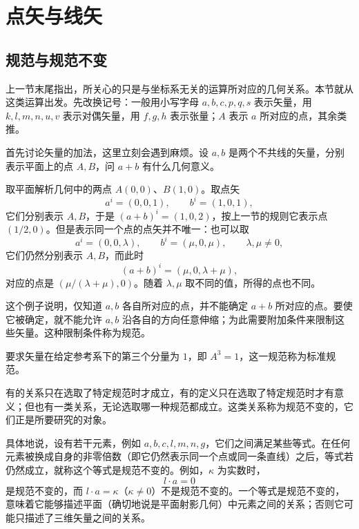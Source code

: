 \chapter{点矢与线矢}

\section{规范与规范不变}

上一节末尾指出，所关心的只是与坐标系无关的运算所对应的几何关系。本节就从这类运算出发。先改换记号：一般用小写字母 $a,b,c,p,q,s$ 表示矢量，用 $k,l,m,n,u,v$ 表示对偶矢量，用 $f,g,h$ 表示张量；$A$ 表示 $a$ 所对应的点，其余类推。

首先讨论矢量的加法，这里立刻会遇到麻烦。设 $a,b$ 是两个不共线的矢量，分别表示平面上的点 $A,B$，问 $a+b$ 有什么几何意义。

\begin{example}
取平面解析几何中的两点 $A(0,0)$、$B(1,0)$。取点矢
\[
a^i=(0,0,1),\qquad b^i=(1,0,1),
\]
它们分别表示 $A,B$，于是 $(a+b)^i=(1,0,2)$，按上一节的规则它表示点 $(1/2,0)$。但是表示同一个点的点矢并不唯一：也可以取
\[
a^i=(0,0,\lambda),\qquad b^i=(\mu,0,\mu),\qquad \lambda,\mu\neq 0,
\]
它们仍然分别表示 $A,B$，而此时
\[
(a+b)^i=(\mu,0,\lambda+\mu),
\]
对应的点是 $(\mu/(\lambda+\mu),0)$。随着 $\lambda,\mu$ 取不同的值，所得的点也不同。
\end{example}

这个例子说明，仅知道 $a,b$ 各自所对应的点，并不能确定 $a+b$ 所对应的点。要使它被确定，就不能允许 $a,b$ 沿各自的方向任意伸缩；为此需要附加条件来限制这些矢量。这种限制条件称为规范。

\begin{definition}[标准规范]
要求矢量在给定参考系下的第三个分量为 $1$，即 $A^3=1$，这一规范称为标准规范。
\end{definition}

有的关系只在选取了特定规范时才成立，有的定义只在选取了特定规范时才有意义；但也有一类关系，无论选取哪一种规范都成立。这类关系称为规范不变的，它们正是所要研究的对象。

具体地说，设有若干元素，例如 $a,b,c,l,m,n,g$，它们之间满足某些等式。在任何元素被换成自身的非零倍数（即它仍然表示同一个点或同一条直线）之后，等式若仍然成立，就称这个等式是规范不变的。例如，$\kappa$ 为实数时，
\[
l\cdot a=0
\]
是规范不变的，而 $l\cdot a=\kappa$（$\kappa\neq 0$）不是规范不变的。一个等式是规范不变的，意味着它能够描述平面（确切地说是平面射影几何）中元素之间的关系；否则它可能只描述了三维矢量之间的关系。

